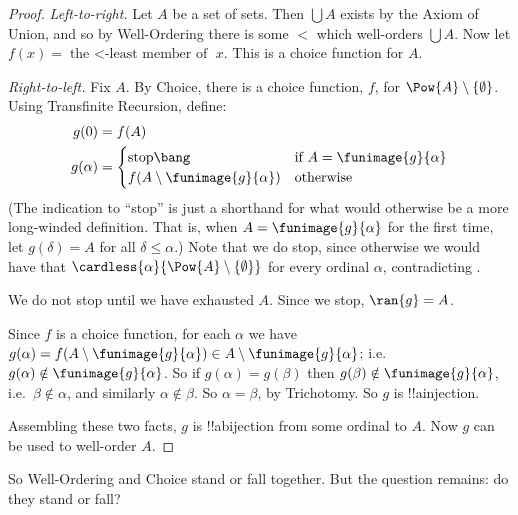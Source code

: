 \documentclass[../../../include/open-logic-section]{subfiles}
\begin{document}
	\begin{proof}
		\emph{Left-to-right.} Let $A$ be a set of sets. Then $\bigcup A$ exists by the Axiom of Union, and so by Well-Ordering there is some $<$ which well-orders $\bigcup A$. Now let $f(x) = \text{the $<$-least member of }x$. This is a choice function for $A$.
		
		\emph{Right-to-left.} Fix $A$. By Choice, there is a choice function, $f$,  for $\Pow{A} \setminus \{\emptyset\}$. Using Transfinite Recursion, define:
		\begin{align*}
			g(0) &= f(A)\\
			g(\alpha) &= 
			\begin{cases}
				\text{stop\bang} &\text{if }A = \funimage{g}{\alpha}\\
				f(A \setminus \funimage{g}{\alpha}) & \text{otherwise}\\	
			\end{cases}
		\end{align*}
		(The indication to ``stop\bang'' is just a shorthand for what would otherwise be a more long-winded definition. That is, when $A = \funimage{g}{\alpha}$ for the first time, let $g(\delta) = A$ for all $\delta \leq \alpha$.) Note that we do stop, since otherwise we would have that $\cardless{\alpha}{\Pow{A} \setminus \{\emptyset\}}$ for every ordinal $\alpha$, contradicting . 
		
		We do not stop  until we have exhausted $A$. Since we stop, $\ran{g} = A$. 

		Since $f$ is a choice function, for each $\alpha$ we have $g(\alpha) = f(A \setminus \funimage{g}{\alpha}) \in A \setminus \funimage{g}{\alpha}$; i.e.\ $g(\alpha) \notin \funimage{g}{\alpha}$. So if $g(\alpha) = g(\beta)$ then $g(\beta) \notin \funimage{g}{\alpha}$, i.e.\ $\beta \notin \alpha$, and similarly $\alpha \notin \beta$. So $\alpha = \beta$, by Trichotomy. So $g$ is !!a{injection}.
			
		Assembling these two facts, $g$ is !!a{bijection} from some ordinal to $A$. Now $g$ can be used to well-order $A$.
	\end{proof}\noindent
So Well-Ordering and Choice stand or fall together. But the question remains: do they stand or fall?
\end{document}
